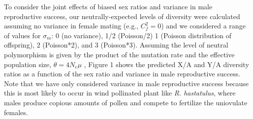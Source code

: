 \documentclass[9pt,twocolumn,twoside]{gsajnl}
\begin{document}
To consider the joint effects of biased sex ratios and variance in male reproductive success, our neutrally-expected levels of diversity were calculated assuming no variance in female mating (e.g., $C^2_{f}=0$) and we considered a range of values for $\sigma_{m}$: 0 (no variance), 1/2 (Poisson/2) 1 (Poisson distribution of offspring), 2 (Poisson*2), and 3 (Poisson*3). Assuming the level of neutral polymorphism is given by the product of the mutation rate and the effective population size, $\theta=4N_{e}\mu$ \citep{watterson1975,kimura1984}, Figure 1 shows the predicted X/A and Y/A diversity ratios as a function of the sex ratio and variance in male reproductive success. Note that we have only considered variance in male reproductive success because this is most likely to occur in wind pollinated plant like \textit{R. hastatulus}, where males produce copious amounts of pollen and compete to fertilize the uniovulate females.













\end{document}
